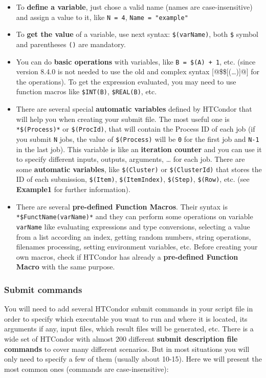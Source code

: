 \documentclass[a4paper,10pt]{article}
\begin{document}
\begin{itemize}
\item To \textbf{define a variable}, just chose a valid name (names are case-insensitive)
and assign a value to it, like \texttt{N = 4}, \texttt{Name = "example"}
\item To \textbf{get the value} of a variable, use next syntax: \texttt{\$(varName)}, both \texttt{\$}
symbol and parentheses \texttt{()} are mandatory.
\item You can do \textbf{basic operations} with variables, like \texttt{B = \$(A) + 1}, etc. (since
version 8.4.0 is not needed to use the old and complex syntax [@\$\$[(\ldots{})]@]
for the operations). To get the expression evaluated, you may need to use
function macros like \texttt{\$INT(B)}, \texttt{\$REAL(B)}, etc.
\item There are several special \textbf{automatic variables} defined by HTCondor that will
help you when creating your submit file. The most useful one is \texttt{*\$(Process)*}
or \texttt{\$(ProcId)}, that will contain the Process ID of each job (if you submit
\texttt{N} jobs, the value of \texttt{\$(Process)} will be \texttt{0} for the first job and \texttt{N-1} in
the last job). This variable is like an \textbf{iteration counter} and you can use it
to specify different inputs, outputs, arguments, \ldots{} for each job. There are
some \textbf{automatic variables}, 
like \texttt{\$(Cluster)} or \texttt{\$(ClusterId)} that stores the ID of each submission,
\texttt{\$(Item)}, \texttt{\$(ItemIndex)}, \texttt{\$(Step)}, \texttt{\$(Row)}, etc. (see \textbf{Example1} for
further information).
\item There are several \textbf{pre-defined Function Macros}. Their syntax is
\texttt{*\$FunctName(varName)*} and they can perform some operations on variable
\texttt{varName} like evaluating expressions and type conversions, selecting a value
from a list according an index, getting random numbers, string operations,
filenames processing, setting environment variables, etc. Before creating your
own macros, check if HTCondor has already a \textbf{pre-defined Function Macro} with
the same purpose.
\end{itemize}

\subsubsection{Submit commands}
\label{sec:orgf0c60a5}

You will need to add several HTCondor submit commands in your script file in
order to specify which executable you want to run and where it is located, its
arguments if any, input files, which result files will be generated, etc. There
is a wide set of HTCondor with almost 200 different \textbf{submit description file
commands} to cover many different scenarios. But in most situations you will
only need to specify a few of them (usually about 10-15). Here we will present
the most common ones (commands are case-insensitive):
\end{document}

